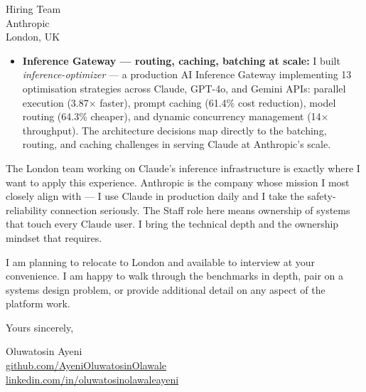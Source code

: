 \documentclass[12pt,a4paper]{letter}
\begin{document}
\begin{letter}{Hiring Team \\ Anthropic \\ London, UK}
\begin{itemize}
  \item \textbf{Inference Gateway — routing, caching, batching at scale:} I built \textit{inference-optimizer} — a production AI Inference Gateway implementing 13 optimisation strategies across Claude, GPT-4o, and Gemini APIs: parallel execution (3.87$\times$ faster), prompt caching (61.4\% cost reduction), model routing (64.3\% cheaper), and dynamic concurrency management (14$\times$ throughput). The architecture decisions map directly to the batching, routing, and caching challenges in serving Claude at Anthropic's scale.
\end{itemize}

The London team working on Claude's inference infrastructure is exactly where I want to apply this experience. Anthropic is the company whose mission I most closely align with — I use Claude in production daily and I take the safety-reliability connection seriously. The Staff role here means ownership of systems that touch every Claude user. I bring the technical depth and the ownership mindset that requires.

I am planning to relocate to London and available to interview at your convenience. I am happy to walk through the benchmarks in depth, pair on a systems design problem, or provide additional detail on any aspect of the platform work.

\closing{Yours sincerely,}

Oluwatosin Ayeni \\
\href{https://github.com/AyeniOluwatosinOlawale}{github.com/AyeniOluwatosinOlawale} \\
\href{https://www.linkedin.com/in/oluwatosinolawaleayeni/}{linkedin.com/in/oluwatosinolawaleayeni}

\end{letter}
\end{document}
